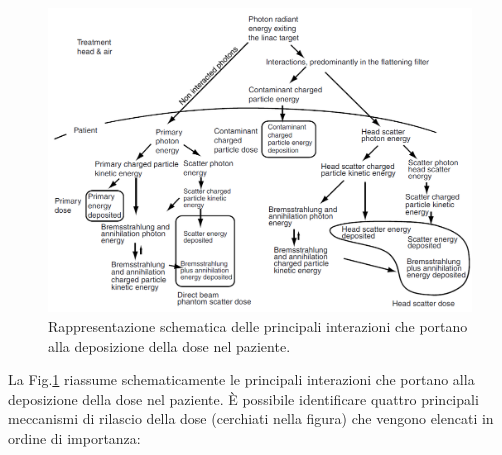 \begin{figure}
\centering
\includegraphics[width=.9\textwidth]{./cap1/processes.png}
\caption{Rappresentazione schematica delle principali interazioni che portano alla deposizione della dose nel paziente.}
\label{fig:processes}
\end{figure}
\vspace{.2cm}
La Fig.\ref{fig:processes} riassume schematicamente le principali interazioni che portano alla deposizione della dose nel paziente. \`{E} possibile identificare quattro principali meccanismi di rilascio della dose (cerchiati nella figura) che vengono elencati in ordine di importanza:
